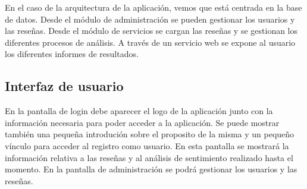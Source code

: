 En el caso de la arquitectura de la aplicación, vemos que está centrada en la base de datos.
Desde el módulo de administración se pueden gestionar los usuarios y las reseñas.
Desde el módulo de servicios se cargan las reseñas y se gestionan los diferentes procesos de análisis.
A través de un servicio web se expone al usuario los diferentes informes de resultados.


\subsection{Interfaz de usuario}
En la pantalla de login debe aparecer el logo de la aplicación 
junto con la información necesaria para poder acceder a la aplicación.
Se puede mostrar también una pequeña introdución sobre el proposito de la misma y 
un pequeño vínculo para acceder al registro como usuario.
En esta pantalla se mostrará la información relativa a las reseñas y 
al análisis de sentimiento realizado hasta el momento.
En la pantalla de administración se podrá gestionar los usuarios y las reseñas.
